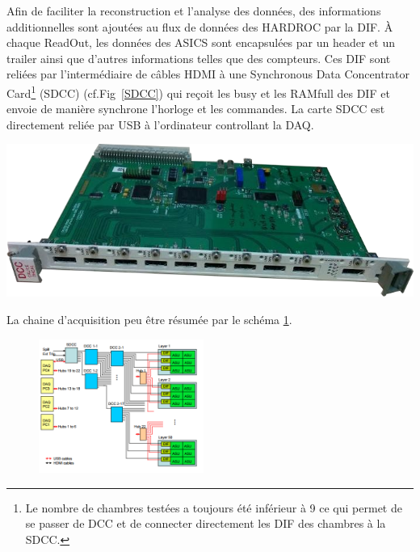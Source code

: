 Afin de faciliter la reconstruction et l'analyse des données, des informations additionnelles sont ajoutées au flux de données des HARDROC par la DIF. À chaque ReadOut, les données des ASICS sont encapsulées par un header et un trailer ainsi que d'autres informations telles que des compteurs. Ces DIF sont reliées par l'intermédiaire de câbles HDMI à une Synchronous Data Concentrator Card\footnote{Le nombre de chambres testées a toujours été inférieur à \num{9} ce qui permet de se passer de DCC et de connecter directement les DIF des chambres à la SDCC.} (SDCC) (cf.Fig~\ref{SDCC}) \cite{Baulieu:2015pfa} qui reçoit les busy et les RAMfull des DIF et envoie de manière synchrone l'horloge et les commandes. La carte SDCC est directement reliée par USB à l'ordinateur controllant la DAQ.

\marginpar
{
	\centering
	\includegraphics[width=\marginparwidth]{GLA/SDCC.png}
	\label{SDCC}
}


La chaine d'acquisition peu être résumée par le schéma \ref{chaine}. 

\begin{figure}[ht!]
	\centering
	\includegraphics[width=0.48\textwidth]{GLA/chaine.png}
	\label{chaine}
\end{figure}


